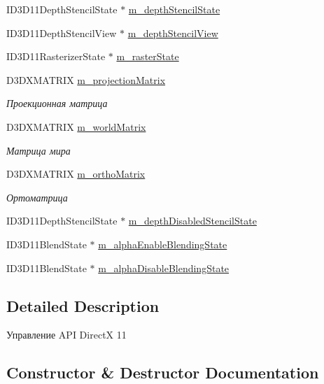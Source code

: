 \begin{DoxyCompactItemize}
\item 
I\+D3\+D11\+Depth\+Stencil\+State $\ast$ \hyperlink{class_d3_d_class_a0d38fcb1b82ee65c23f35f783906168d}{m\+\_\+depth\+Stencil\+State}
\item 
I\+D3\+D11\+Depth\+Stencil\+View $\ast$ \hyperlink{class_d3_d_class_a347ce3973479a5ab5d7a7c36ba59553d}{m\+\_\+depth\+Stencil\+View}
\item 
I\+D3\+D11\+Rasterizer\+State $\ast$ \hyperlink{class_d3_d_class_a1d21be73b82c0e8c3a512c1cbfeba030}{m\+\_\+raster\+State}
\item 
D3\+D\+X\+M\+A\+T\+R\+IX \hyperlink{class_d3_d_class_a2020c9798506498bd7411104903615e4}{m\+\_\+projection\+Matrix}
\begin{DoxyCompactList}\small\item\em Проекционная матрица \end{DoxyCompactList}\item 
D3\+D\+X\+M\+A\+T\+R\+IX \hyperlink{class_d3_d_class_a3b96f1d257d67248da848290bba52db7}{m\+\_\+world\+Matrix}
\begin{DoxyCompactList}\small\item\em Матрица мира \end{DoxyCompactList}\item 
D3\+D\+X\+M\+A\+T\+R\+IX \hyperlink{class_d3_d_class_a68d1081e456d0b9d53de866153d68db1}{m\+\_\+ortho\+Matrix}
\begin{DoxyCompactList}\small\item\em Ортоматрица \end{DoxyCompactList}\item 
I\+D3\+D11\+Depth\+Stencil\+State $\ast$ \hyperlink{class_d3_d_class_a294df487d444d4b79cc82d7286e9b36e}{m\+\_\+depth\+Disabled\+Stencil\+State}
\item 
I\+D3\+D11\+Blend\+State $\ast$ \hyperlink{class_d3_d_class_a8123b5c065750fe887757e6e170d5c82}{m\+\_\+alpha\+Enable\+Blending\+State}
\item 
I\+D3\+D11\+Blend\+State $\ast$ \hyperlink{class_d3_d_class_a445590e41f287cc7ec799f2b80f701c4}{m\+\_\+alpha\+Disable\+Blending\+State}
\end{DoxyCompactItemize}


\subsection{Detailed Description}
Управление A\+PI DirectX 11 

\subsection{Constructor \& Destructor Documentation}
\mbox{\label{class_d3_d_class_a889771d09ad54486caf56bc64e156aa6}} 

